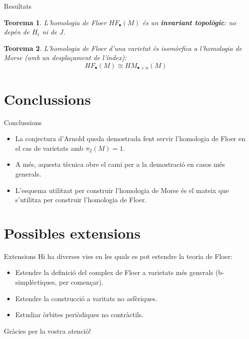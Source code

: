 \documentclass{beamer}
\newtheorem{teorema}{Teorema}
\begin{document}
\begin{frame}{Resultats}
	\begin{teorema}
		L'homologia de Floer $HF_{\bullet}(M)$ és un {\bf invariant topològic}: no depén de $H_t$ ni de $J$.
	\end{teorema}

	\begin{teorema}
		L'homologia de Floer d'una varietat és isomòrfica a l'homologia de Morse (amb un desplaçament de l'índex):
		\[HF_{\bullet}(M) \cong HM_{\bullet+n}(M)\]
	\end{teorema}
\end{frame}

\section{Conclussions}

\begin{frame}{Conclussions}
	\begin{itemize}
		\item La conjectura d'Arnold queda demostrada fent servir l'homologia de Floer en el cas de varietats amb $\pi_2(M) = 1$.
		\item A més, aquesta tècnica obre el camí per a la demostració en casos més generals.
		\item L'esquema utilitzat per construir l'homologia de Morse és el mateix que s'utilitza per construir l'homologia de Floer.
	\end{itemize}
\end{frame}

\section{Possibles extensions}

\begin{frame}{Extensions}
	Hi ha diverses vies en les quals es pot estendre la teoria de Floer:
	\begin{itemize}
		\item Estendre la definició del complex de Floer a varietats més generals (b-simplèctiques, per començar).
		\item Estendre la construcció a varitats no asfèriques.
		\item Estudiar òrbites periòdiques no contràctils.
	\end{itemize}
\end{frame}

\begin{frame}
	\begin{center}
		\huge Gràcies per la vostra atenció!
	\end{center}
\end{frame}
\end{document}
